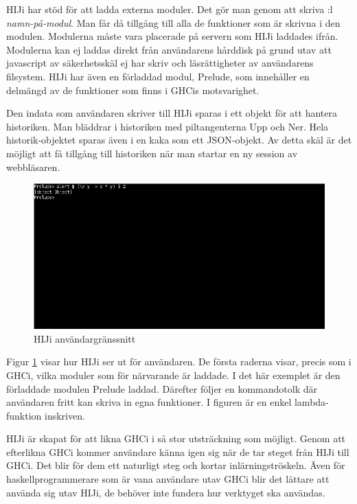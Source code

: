 HIJi har stöd för att ladda externa moduler. Det gör man genom att skriva :l \emph{namn-på-modul}. Man får då tillgång till alla de funktioner som är skrivna i den modulen. Modulerna måste vara placerade på servern som HIJi laddades ifrån. Modulerna kan ej laddas direkt från användarens hårddisk på grund utav att javascript av säkerhetsskäl ej har skriv och läsrättigheter av användarens filsystem. HIJi har även en förladdad modul, Prelude, som innehåller en delmängd av de funktioner som finns i GHCis motsvarighet. 

Den indata som användaren skriver till HIJi sparas i ett objekt för att hantera historiken. Man bläddrar i historiken med piltangenterna Upp och Ner. Hela historik-objektet sparas även i en kaka som ett JSON-objekt. Av detta skäl är det möjligt att få tillgång till historiken när man startar en ny session av webbläsaren.

\begin{figure}[H]
    \begin{center}
        \includegraphics[width=1\textwidth]{hiji_screen3.png}
        \caption{HIJi användargränssnitt}
        \label{fig:hiji} %
    \end{center}
\end{figure}

Figur \ref{fig:hiji} visar hur HIJi ser ut för användaren. De första raderna visar, precis som i GHCi, vilka moduler som för närvarande är laddade. I det här exemplet är den förladdade modulen Prelude laddad. Därefter följer en kommandotolk där användaren fritt kan skriva in egna funktioner. I figuren är en enkel lambda-funktion inskriven.

HIJi är skapat för att likna GHCi i så stor utsträckning som möjligt.
Genom att efterlikna GHCi kommer användare känna igen sig när de tar steget från HIJi till GHCi. Det blir för dem ett naturligt steg och kortar inlärningströskeln. Även för haskellprogrammerare som är vana användare utav GHCi blir det lättare att använda sig utav HIJi, de behöver inte fundera hur verktyget ska användas.
